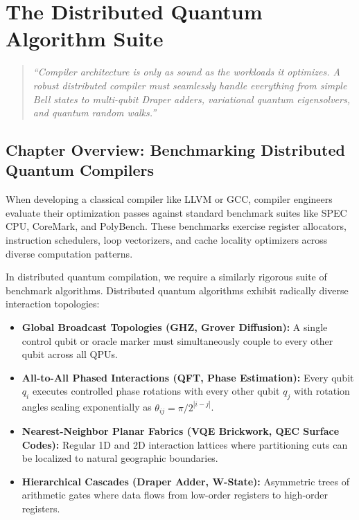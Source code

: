 \chapter{The Distributed Quantum Algorithm Suite}
\label{ch:quantum_algorithm_suite}

\begin{quote}
\textit{``Compiler architecture is only as sound as the workloads it optimizes. A robust distributed compiler must seamlessly handle everything from simple Bell states to multi-qubit Draper adders, variational quantum eigensolvers, and quantum random walks.''}
\end{quote}

\section*{Chapter Overview: Benchmarking Distributed Quantum Compilers}

When developing a classical compiler like LLVM or GCC, compiler engineers evaluate their optimization passes against standard benchmark suites like SPEC CPU, CoreMark, and PolyBench. These benchmarks exercise register allocators, instruction schedulers, loop vectorizers, and cache locality optimizers across diverse computation patterns.

In distributed quantum compilation, we require a similarly rigorous suite of benchmark algorithms. Distributed quantum algorithms exhibit radically diverse interaction topologies:
\begin{itemize}
    \item \textbf{Global Broadcast Topologies (GHZ, Grover Diffusion):} A single control qubit or oracle marker must simultaneously couple to every other qubit across all QPUs.
    \item \textbf{All-to-All Phased Interactions (QFT, Phase Estimation):} Every qubit $q_i$ executes controlled phase rotations with every other qubit $q_j$ with rotation angles scaling exponentially as $\theta_{ij} = \pi / 2^{|i-j|}$.
    \item \textbf{Nearest-Neighbor Planar Fabrics (VQE Brickwork, QEC Surface Codes):} Regular 1D and 2D interaction lattices where partitioning cuts can be localized to natural geographic boundaries.
    \item \textbf{Hierarchical Cascades (Draper Adder, W-State):} Asymmetric trees of arithmetic gates where data flows from low-order registers to high-order registers.
\end{itemize}


